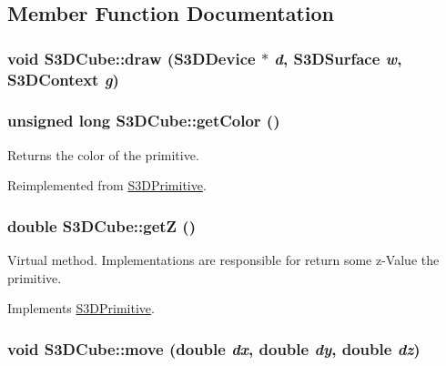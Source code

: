 \subsection{Member Function Documentation}
\hypertarget{class_s3_d_cube_a1e66a1dab7e99328fab61c2c86da7ba5}{
\subsubsection[{draw}]{\setlength{\rightskip}{0pt plus 5cm}void S3DCube::draw ({\bf S3DDevice} $\ast$ {\em d}, \/  {\bf S3DSurface} {\em w}, \/  {\bf S3DContext} {\em g})}}
\label{class_s3_d_cube_a1e66a1dab7e99328fab61c2c86da7ba5}
\hypertarget{class_s3_d_cube_ab856b6fa4c1b72be7d2d7b79e26f3c38}{
\subsubsection[{getColor}]{\setlength{\rightskip}{0pt plus 5cm}unsigned long S3DCube::getColor ()}}
\label{class_s3_d_cube_ab856b6fa4c1b72be7d2d7b79e26f3c38}


Returns the color of the primitive. 



Reimplemented from \hyperlink{class_s3_d_primitive_a4102845e7754e44c51a87c0fcb391c73}{S3DPrimitive}.

\hypertarget{class_s3_d_cube_a4ac1d080b330d6b69d24097f746ddd4c}{
\subsubsection[{getZ}]{\setlength{\rightskip}{0pt plus 5cm}double S3DCube::getZ ()}}
\label{class_s3_d_cube_a4ac1d080b330d6b69d24097f746ddd4c}


Virtual method. Implementations are responsible for return some z-\/Value the primitive. 



Implements \hyperlink{class_s3_d_primitive_ab5b06d3a8e83216cc42554bb78afd2d9}{S3DPrimitive}.

\hypertarget{class_s3_d_cube_ab21a1988528297602452984f8a3c093e}{
\subsubsection[{move}]{\setlength{\rightskip}{0pt plus 5cm}void S3DCube::move (double {\em dx}, \/  double {\em dy}, \/  double {\em dz})}}
\label{class_s3_d_cube_ab21a1988528297602452984f8a3c093e}


